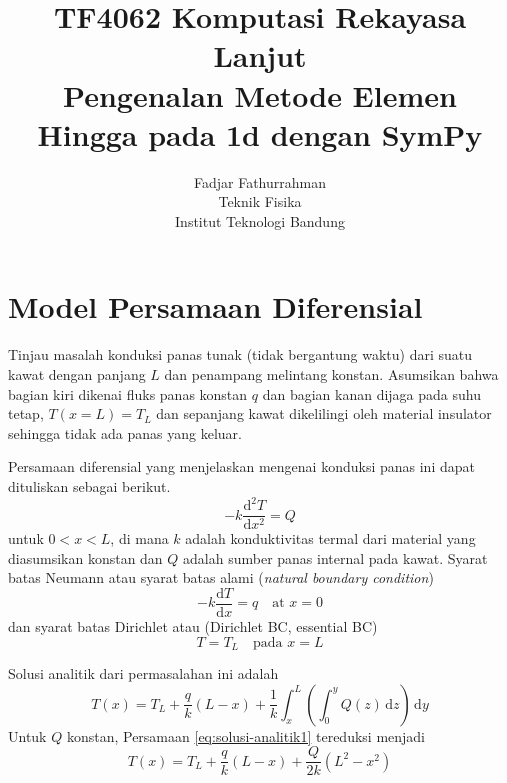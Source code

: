 



\title{%
{\small TF4062 Komputasi Rekayasa Lanjut}\\
Pengenalan Metode Elemen Hingga pada 1d dengan SymPy
}
\author{Fadjar Fathurrahman\\
Teknik Fisika\\
Institut Teknologi Bandung}
\date{}
\maketitle

\section{Model Persamaan Diferensial}

Tinjau masalah konduksi panas tunak (tidak bergantung waktu) dari suatu kawat dengan
panjang $L$ dan penampang melintang konstan. Asumsikan bahwa bagian kiri dikenai fluks
panas konstan $q$ dan bagian kanan dijaga pada suhu tetap, $T(x=L) = T_L$ dan
sepanjang kawat dikelilingi oleh material insulator sehingga tidak ada
panas yang keluar.

Persamaan diferensial yang menjelaskan mengenai konduksi panas ini dapat dituliskan
sebagai berikut.
\begin{equation}
-k \frac{\mathrm{d}^2 T}{\mathrm{d}x^2} = Q
\end{equation}
untuk $0 < x < L$, di mana $k$
adalah konduktivitas termal dari material yang diasumsikan konstan dan
$Q$ adalah sumber panas internal pada kawat.
Syarat batas Neumann atau syarat batas alami (\textit{natural boundary condition})
\begin{equation}
-k\frac{\mathrm{d}T}{\mathrm{d}x} = q \quad \text{at } x = 0
\end{equation}
dan syarat batas Dirichlet atau
 (Dirichlet BC, essential BC)
\begin{equation}
T = T_{L} \quad \text{pada } x = L
\end{equation}

Solusi analitik dari permasalahan ini adalah
\begin{equation}
T(x) = T_{L} + \frac{q}{k}(L - x) + \frac{1}{k} \int_{x}^{L}
\left( \int_{0}^{y} Q(z)\,\mathrm{d}z \right)\,\mathrm{d}y
\label{eq:solusi-analitik1}
\end{equation}
%
Untuk $Q$ konstan, Persamaan \eqref{eq:solusi-analitik1}
tereduksi menjadi
\begin{equation}
T(x) = T_{L} + \frac{q}{k}(L - x) + \frac{Q}{2k}(L^2 - x^2)
\end{equation}

